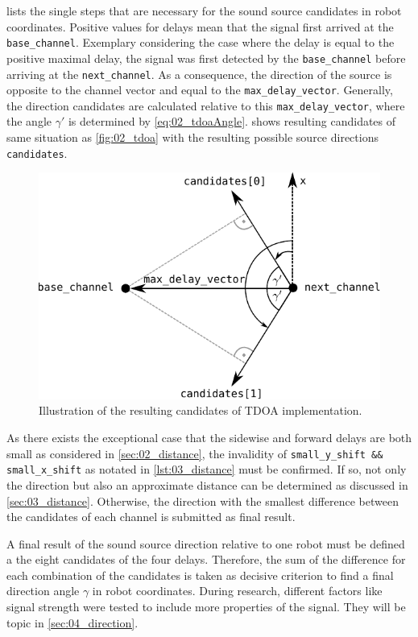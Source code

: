  lists the single steps that are necessary for the sound source
candidates in robot coordinates.
Positive values for delays mean that the signal first arrived at the \lstinline!base_channel!.
Exemplary considering the case where the delay is equal to the positive maximal delay,
the signal was first
detected by the \lstinline!base_channel! before arriving at the \lstinline!next_channel!.
As a consequence, the direction of the source is opposite to the channel vector and equal
to the \lstinline!max_delay_vector!.
Generally, the direction candidates are calculated relative to this \lstinline!max_delay_vector!,
where the angle $\gamma'$ is determined by \cref{eq:02_tdoaAngle}.
 shows resulting candidates of same situation as \cref{fig:02_tdoa} with
the resulting possible source directions \lstinline!candidates!.
\begin{figure}[ht]
	\centering
		\includegraphics[width=0.6\columnwidth]{figures/tdoa_code}
	\caption{Illustration of the resulting candidates of \ac{TDOA} implementation.}
	\label{fig:03_tdoaCode}
\end{figure}

As there exists the exceptional case that the sidewise and forward delays are both small
as considered in \cref{sec:02_distance}, the invalidity of
\lstinline!small_y_shift && small_x_shift! as notated in \cref{lst:03_distance} must
be confirmed.
If so, not only the direction but also an approximate distance can be determined
as discussed in \cref{sec:03_distance}.
Otherwise, the direction with the smallest difference between the
candidates of each channel is submitted as final result.

A final result of the sound source direction relative to one robot must be defined
a the eight candidates of the four delays.
Therefore, the sum of the difference for each combination of the candidates
is taken as decisive criterion to find a final direction angle $\gamma$ in robot coordinates.
During research, different factors like signal strength were tested to include
more properties of the signal. They will be topic in \ref{sec:04_direction}.


